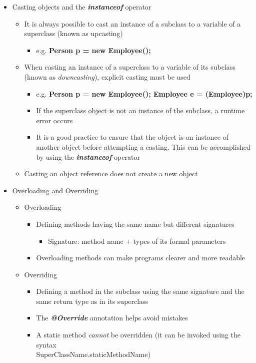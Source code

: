 \begin{itemize}
	\item Casting objects and the \textit{\textbf{instanceof}} operator
	\begin{itemize}
		\item It is always possible to cast an instance of a subclass to a variable of a superclass (known as upcasting)
		\begin{itemize}
			\item e.g. \textbf{Person p = new Employee();}
		\end{itemize}
		\item When casting an instance of a superclass to a variable of its subclass (known as \textit{downcasting}), explicit casting must be used
		\begin{itemize}
			\item e.g. \textbf{Person p = new Employee(); Employee e = (Employee)p;}
			\item If the superclass object is not an instance of the subclass, a runtime error occurs
			\item  It is a good practice to ensure that the object is an instance of another object before attempting a casting. This can be accomplished by using the \textit{\textbf{instanceof}} operator
		\end{itemize}
		\item Casting an object reference does not create a new object
	\end{itemize}

	\item Overloading and Overriding
	\begin{itemize}
		\item Overloading
		\begin{itemize}
			\item Defining methods having the same name but different signatures
			\begin{itemize}
				\item Signature: method name + types of its formal parameters
			\end{itemize}
			\item Overloading methods can make programs clearer and more readable
		\end{itemize}
		\item Overriding
		\begin{itemize}
			\item Defining a method in the subclass using the same signature and the same
			return type as in its superclass
			\item The \textbf{\textit{@Override}} annotation helps avoid mistakes
			\item A static method \textit{cannot} be overridden (it can be invoked using the syntax\\
			SuperClassName.staticMethodName)
		\end{itemize}
	\end{itemize}


\end{itemize}
